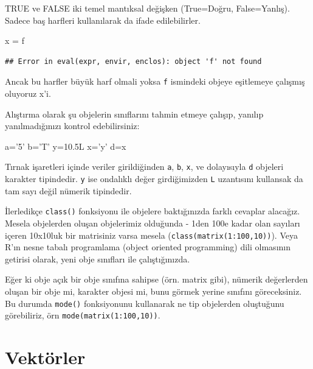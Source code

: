 \documentclass[]{book}
\newenvironment{Shaded}{\begin{snugshade}}{\end{snugshade}}
\newcommand{\FloatTok}[1]{\textcolor[rgb]{0.00,0.00,0.81}{#1}}
\newcommand{\NormalTok}[1]{#1}
\newcommand{\StringTok}[1]{\textcolor[rgb]{0.31,0.60,0.02}{#1}}
\begin{document}
TRUE ve FALSE iki temel mantıksal değişken (True=Doğru, False=Yanlış).
Sadece baş harfleri kullanılarak da ifade edilebilirler.

\begin{Shaded}
\begin{Highlighting}[]
\NormalTok{x =}\StringTok{ }\NormalTok{f}
\end{Highlighting}
\end{Shaded}

\begin{verbatim}
## Error in eval(expr, envir, enclos): object 'f' not found
\end{verbatim}

Ancak bu harfler büyük harf olmali yoksa \texttt{f} ismindeki objeye
eşitlemeye çalışmış oluyoruz x'i.

Alıştırma olarak şu objelerin sınıflarını tahmin etmeye çalışıp, yanılıp
yanılmadığınızı kontrol edebilirsiniz:

\begin{Shaded}
\begin{Highlighting}[]
\NormalTok{a=}\StringTok{'5'} 
\NormalTok{b=}\StringTok{'T'}
\NormalTok{y=}\FloatTok{10.5}\NormalTok{L}
\NormalTok{x=}\StringTok{'y'}
\NormalTok{d=x}
\end{Highlighting}
\end{Shaded}

Tırnak işaretleri içinde veriler girildiğinden \texttt{a}, \texttt{b},
\texttt{x}, ve dolayısıyla \texttt{d} objeleri karakter tipindedir.
\texttt{y} ise ondalıklı değer girdiğimizden \texttt{L} uzantısını
kullansak da tam sayı değil nümerik tipindedir.

İlerledikçe \texttt{class()} fonksiyonu ile objelere baktığınızda farklı
cevaplar alacağız. Mesela objelerden oluşan objelerimiz olduğunda - 1den
100e kadar olan sayıları içeren 10x10luk bir matrisiniz varsa mesela
(\texttt{class(matrix(1:100,10))}). Veya R'ın nesne tabalı programlama
(object oriented programming) dili olmasının getirisi olarak, yeni obje
sınıfları ile çalıştığınızda.

Eğer ki obje açık bir obje sınıfına sahipse (örn. matrix gibi), nümerik
değerlerden oluşan bir obje mi, karakter objesi mi, bunu görmek yerine
sınıfını göreceksiniz. Bu durumda \texttt{mode()} fonksiyonunu
kullanarak ne tip objelerden oluştuğunu görebiliriz, örn
\texttt{mode(matrix(1:100,10))}.

\hypertarget{vektorler}{%
\chapter{Vektörler}\label{vektorler}}
\end{document}
